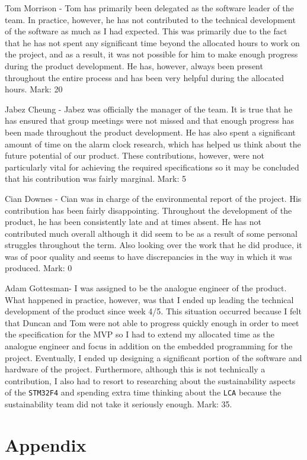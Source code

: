 \documentclass[12pt]{article}
\begin{document}
Tom Morrison - Tom has primarily been delegated as the software leader of the team. In practice, however, he has not contributed to the technical development of the software as much as I had expected. This was primarily due to the fact that he has not spent any significant time beyond the allocated hours to work on the project, and as a result, it was not possible for him to make enough progress during the product development. He has, however, always been present throughout the entire process and has been very helpful during the allocated hours. Mark: 20

Jabez Cheung - Jabez was officially the manager of the team. It is true that he has ensured that group meetings were not missed and that enough progress has been made throughout the product development. He has also spent a significant amount of time on the alarm clock research, which has helped us think about the future potential of our product. These contributions, however, were not particularly vital for achieving the required specifications so it may be concluded that his contribution was fairly marginal. Mark: 5

Cian Downes - Cian was in charge of the environmental report of the project. His contribution has been fairly disappointing. Throughout the development of the product, he has been consistently late and at times absent. He has not contributed much overall although it did seem to be as a result of some personal struggles throughout the term. Also looking over the work that he did produce, it was of poor quality and seems to have discrepancies in the way in which it was produced. Mark: 0

Adam Gottesman- I was assigned to be the analogue engineer of the product. What happened in practice, however, was that I ended up leading the technical development of the product since week 4/5. This situation occurred because I felt that Duncan and Tom were not able to progress quickly enough in order to meet the specification for the MVP so I had to extend my allocated time as the analogue engineer and focus in addition on the embedded programming for the project. Eventually, I ended up designing a significant portion of the software and hardware of the project. Furthermore, although this is not technically a contribution, I also had to resort to researching about the sustainability aspects of the \texttt{STM32F4} and spending extra time thinking about the \texttt{LCA} because the sustainability team did not take it seriously enough. Mark: 35.
\newpage

\newpage
\section{Appendix}
\end{document}
